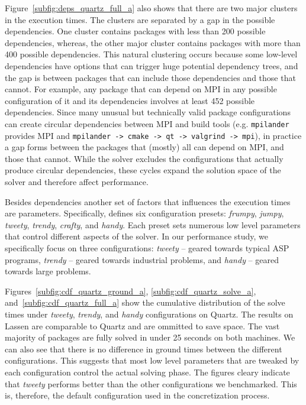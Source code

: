 Figure~\ref{subfig:deps_quartz_full_a} also shows that there are two major clusters in the execution times. The clusters are separated by a gap in the possible dependencies. One cluster contains packages with less than 200 possible dependencies, whereas, the other major cluster contains packages with more than 400 possible dependencies. This natural clustering occurs because some low-level dependencies have options that can trigger huge potential dependency trees, and the gap is between packages that can include those dependencies and those that cannot. For example, any package that can depend on MPI in any possible configuration of it and its dependencies involves at least 452 possible dependencies. Since many unusual but technically valid package configurations can create circular dependencies between MPI and build tools (e.g. \texttt{mpilander} provides MPI and \texttt{mpilander -> cmake -> qt -> valgrind -> mpi}), in practice a gap forms between the packages that (mostly) all can depend on MPI, and those that cannot. While the solver excludes the configurations that actually produce circular dependencies, these cycles expand the solution space of the solver and therefore affect performance.


% 

% 

% 

Besides dependencies another set of factors that influences the execution times are \clingo{} parameters. Specifically, \clingo{} defines six configuration presets: \emph{frumpy}, \emph{jumpy}, \emph{tweety}, \emph{trendy}, \emph{crafty}, and \emph{handy}. Each preset sets numerous low level parameters that control different aspects of the solver. In our performance study, we specifically focus on three configurations: \emph{tweety} -- geared towards typical ASP programs, \emph{trendy} -- geared towards industrial problems, and \emph{handy} -- geared towards large problems.

Figures~\ref{subfig:cdf_quartz_ground_a}, \ref{subfig:cdf_quartz_solve_a}, and~\ref{subfig:cdf_quartz_full_a} show the cumulative distribution of the solve times under \emph{tweety}, \emph{trendy}, and \emph{handy} configurations on Quartz. The results on Lassen are comparable to Quartz and are ommitted to save space. The vast majority of packages are fully solved in under 25 seconds on both machines. We can also see that there is no difference in ground times between the different configurations. This suggests that most low level parameters that are tweaked by each configuration control the actual solving phase. The figures cleary indicate that \emph{tweety} performs better than the other configurations we benchmarked. This is, therefore, the default configuration used in the concretization process.

